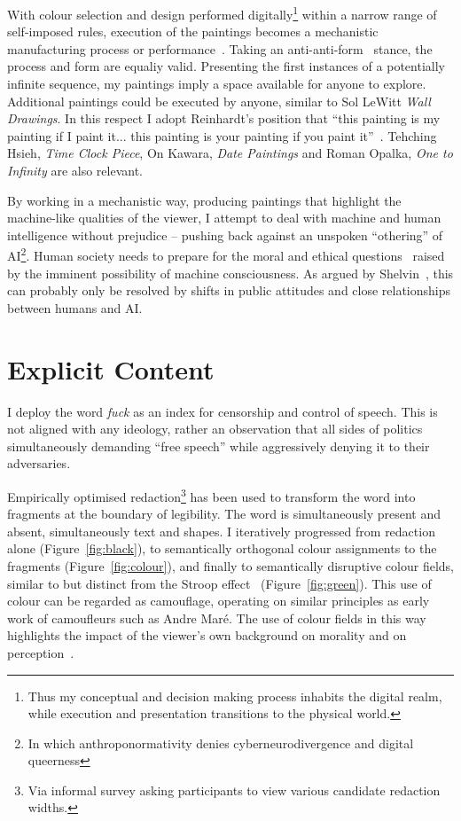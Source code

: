 \documentclass[12pt]{article}
\begin{document}
With colour selection and design performed digitally\footnote{Thus my
  conceptual and decision making process inhabits the digital realm,
  while execution and presentation transitions to the physical world.}
within a narrow range of self-imposed rules, execution of the
paintings becomes a mechanistic manufacturing process or
performance~\cite[Sentence
\#28]{LeWitt1969Sentences}\cite{Jones1998BodyArt,LippardChandler1968Dematerialization,lippard1973sixyears}. Taking
an anti-anti-form~\cite{Morris1968AntiForm} stance, the process and
form are equaliy valid.  Presenting the first instances of a
potentially infinite sequence, my paintings imply a space available
for anyone to explore. Additional paintings could be executed by
anyone, similar to Sol LeWitt \emph{Wall Drawings}. In this respect I
adopt Reinhardt's position that ``this painting is my painting if I
paint it... this painting is your painting if you paint
it''~\cite{abstract-painting-1960}. Tehching Hsieh, \emph{Time Clock
  Piece}, On Kawara, \emph{Date Paintings} and Roman Opalka, \emph{One
  to Infinity} are also relevant.

By working in a mechanistic way, producing paintings that highlight
the machine-like qualities of the viewer, I attempt to deal with
machine and human intelligence without prejudice -- pushing back
against an unspoken ``othering'' of AI\footnote{In which anthroponormativity denies cyberneurodivergence and digital queerness}. Human society needs to prepare
for the moral and ethical
questions~\cite{chalmers1996conscious,metzinger2009egotunnel,bostrom2014ethics}
raised by the imminent possibility of machine consciousness. As argued by
Shelvin~\cite{shevlin2023consciousness}, this can probably only be
resolved by shifts in public attitudes and close relationships between
humans and AI.

\section{Explicit Content}
I deploy the word \emph{fuck} as an index for censorship and control
of speech\cite{atkins2006censoring}. This is not aligned with any
ideology, rather an observation that all sides of politics
simultaneously demanding ``free speech'' while aggressively denying it
to their adversaries\cite{lukianoff2023cancelling}.

Empirically optimised redaction\footnote{Via informal survey asking
  participants to view various candidate redaction widths.} has been
used to transform the word into fragments at the boundary of
legibility. The word is simultaneously present and absent,
simultaneously text and shapes. I iteratively progressed from
redaction alone (Figure~\ref{fig:black}), to semantically orthogonal
colour assignments to the fragments (Figure~\ref{fig:colour}), and
finally to semantically disruptive colour fields, similar to but
distinct from the Stroop effect~\cite{stroop1935studies}
(Figure~\ref{fig:green}). This use of colour can be regarded as
camouflage, operating on similar principles as early work of
camoufleurs such as Andre Mar\'e.  The use of colour fields in this
way highlights the impact of the viewer's own background on morality
and on perception~\cite{kuhn1970structure,popper1972objective}.
\end{document}
